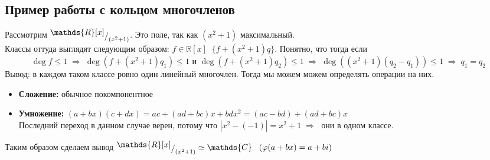 \documentclass[12pt, a4paper]{article}
\newcommand{\re}{\mathds{R}}
\newcommand{\ra}{\;\Rightarrow\;}
\newcommand{\ce}{\mathds{C}}
\newcommand{\m}{\leqslant}
\newcommand{\myfac}[2]{\raisebox{.75ex}{$#1$}\raisebox{-.3ex}{$/$}_{#2}}
\theoremstyle{plain}
\theoremstyle{definition}
\begin{document}
\subsection*{Пример работы с кольцом многочленов}
    Рассмотрим $\raisebox{.75ex}{$\re[x]$}\raisebox{-.3ex}{$/$}_{(x^2+1)}$. Это поле, так как $(x^2+1)$ максимальный.\\
    Классы оттуда выглядят следующим образом: $f\in \re[x]\;\; \{f+(x^2+1)q\}$. Понятно, что тогда если
    \[\deg f\m 1\ra \deg(f+(x^2+1)q_1)\m 1 \text{ и } \deg(f+(x^2+1)q_2)\m 1\ra \deg((x^2+1)(q_2-q_1))\m 1 \ra q_1=q_2\]
    Вывод: в каждом таком классе ровно один линейный многочлен. Тогда мы можем можем определять операции на них.
    \begin{itemize}
        \item \textbf{Сложение:} обычное покомпонентное
        \item \textbf{Умножение:} $(a+bx)(c+dx) = ac+(ad+bc)x+bdx^2 = (ac-bd)+(ad+bc)x$\\
                Последний переход в данном случае верен, потому что $|x^2-(-1)| = x^2+1\ra $ они в одном классе.
    \end{itemize} 
    Таким образом сделаем вывод $\myfac{\re[x]}{(x^2+1)}\simeq \ce\;\;\; (\varphi(a+bx) = a+bi)$
\end{document}

